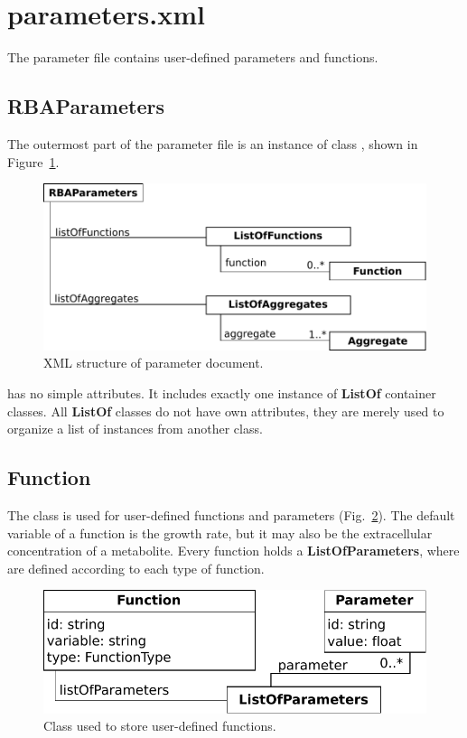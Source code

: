 
\section{parameters.xml}

The parameter file contains user-defined parameters and functions.


\subsection{RBAParameters}
\label{sec:rba_parameters}

The outermost part of the parameter file is an instance of class
\rbaparameters, shown in Figure~\ref{fig:parameters_doc}.

\begin{figure}
  \centering
  \includegraphics[scale=0.8]{figures/parameters_doc}
  \caption{XML structure of parameter document.}
\label{fig:parameters_doc}
\end{figure}

\rbaparameters{} has no simple attributes.
It includes exactly one instance of \textbf{ListOf} container classes.
All \textbf{ListOf} classes do not have own attributes,
they are merely used to organize a list of instances from another class.

\subsection{Function}
\label{sec:function}

The \function{} class is used for user-defined functions and parameters
(Fig.~\ref{fig:parameters_function}).
The default variable of a function is the growth rate, but it may also be
the extracellular concentration of a metabolite.
Every function holds a \textbf{ListOfParameters},
where \parameter{} are defined according to each type of function.

\begin{figure}
  \centering
  \includegraphics[scale=0.8]{figures/parameters_function}
  \caption{Class used to store user-defined functions.}
\label{fig:parameters_function}
\end{figure}

